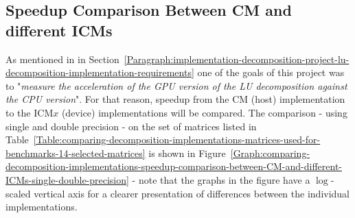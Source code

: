 \subsection{Speedup Comparison Between CM and different ICMs}\label{Subsection:comparing-decomposition-implementations-speedup-comparison-between-CM-and-different-ICMs}
As mentioned in \textit{} in Section~\ref{Paragraph:implementation-decomposition-project-lu-decomposition-implementation-requirements} one of the goals of this project was to "\textit{measure the acceleration of the GPU version of the LU decomposition against the CPU version}". For that reason, speedup from the CM (host) implementation to the ICM$ x $ (device) implementations will be compared. The comparison - using single and double precision - on the set of matrices listed in Table~\ref{Table:comparing-decomposition-implementations-matrices-used-for-benchmarks-14-selected-matrices} is shown in Figure~\ref{Graph:comparing-decomposition-implementations-speedup-comparison-between-CM-and-different-ICMs-single-double-precision} - note that the graphs in the figure have a $ \log $-scaled vertical axis for a clearer presentation of differences between the individual implementations.

